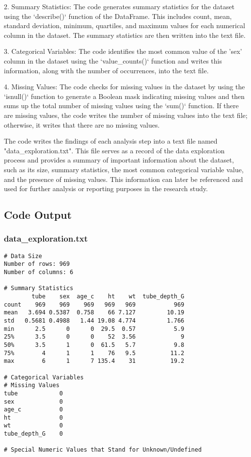 \documentclass[11pt]{article}
\begin{document}
2. Summary Statistics: The code generates summary statistics for the dataset using the `describe()` function of the DataFrame. This includes count, mean, standard deviation, minimum, quartiles, and maximum values for each numerical column in the dataset. The summary statistics are then written into the text file.

3. Categorical Variables: The code identifies the most common value of the 'sex' column in the dataset using the `value\_counts()` function and writes this information, along with the number of occurrences, into the text file.

4. Missing Values: The code checks for missing values in the dataset by using the `isnull()` function to generate a Boolean mask indicating missing values and then sums up the total number of missing values using the `sum()` function. If there are missing values, the code writes the number of missing values into the text file; otherwise, it writes that there are no missing values.

The code writes the findings of each analysis step into a text file named "data\_exploration.txt". This file serves as a record of the data exploration process and provides a summary of important information about the dataset, such as its size, summary statistics, the most common categorical variable value, and the presence of missing values. This information can later be referenced and used for further analysis or reporting purposes in the research study.

\subsection{Code Output}

\subsubsection*{data\_exploration.txt}

\begin{Verbatim}[tabsize=4]
# Data Size
Number of rows: 969
Number of columns: 6

# Summary Statistics
        tube    sex  age_c    ht    wt  tube_depth_G
count    969    969    969   969   969           969
mean   3.694 0.5387  0.758    66 7.127         10.19
std   0.5681 0.4988   1.44 19.08 4.774         1.766
min      2.5      0      0  29.5  0.57           5.9
25%      3.5      0      0    52  3.56             9
50%      3.5      1      0  61.5   5.7           9.8
75%        4      1      1    76   9.5          11.2
max        6      1      7 135.4    31          19.2

# Categorical Variables
# Missing Values
tube            0
sex             0
age_c           0
ht              0
wt              0
tube_depth_G    0

# Special Numeric Values that Stand for Unknown/Undefined

\end{Verbatim}
\end{document}
